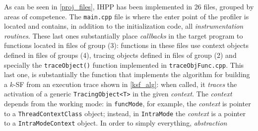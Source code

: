 \documentclass[a4paper,11pt]{report}
\begin{document}
As can be seen in \cref{proj_files}, IHPP has been implemented in 26 files,
grouped by areas of competence. The \verb|main.cpp| file is where the enter point
 of the profiler is located and contains, in addition to the initialization code, all \emph{instrumentation routines}. These last ones substantially place \emph{callbacks}
in the target program to functions located in files of group (3): functions in these
files use context objects defined in files of groups (4), 
tracing objects defined in files of group (2) and specially
the \verb|traceObject()| function implemented in \verb|traceObjFunc.cpp|.
This last one, is substantially the function that implements the algorithm for building
a $k$-SF from an execution trace shown in \cref{ksf_alg}: 
when called, it \emph{traces} the activation of a generic \verb|TracingObject<T>| 
in the given \emph{context}. The \emph{context} depends from the working mode:
in \verb|funcMode|, for example, the \emph{context} is pointer to a \verb|ThreadContextClass| object; instead, in \verb|IntraMode| the \emph{context} is 
a pointer to a \verb|IntraModeContext| object. In order to simply everything, 
\emph{abstraction}
\end{document}
